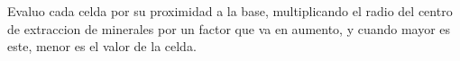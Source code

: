 Evaluo cada celda por su proximidad a la base, multiplicando el radio del centro de extraccion de minerales por un factor que va en aumento, y cuando mayor es este, menor es el valor de la celda.
